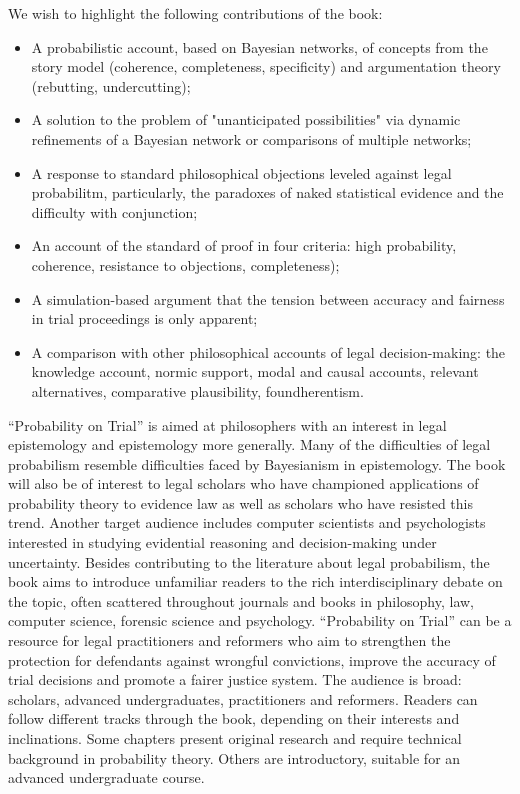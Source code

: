 \documentclass[
  10pt,
  dvipsnames,enabledeprecatedfontcommands]{scrartcl}
\begin{document}
We wish to highlight the following contributions of the book:

\begin{itemize}
\item A probabilistic account, based on Bayesian networks, of concepts from the story model (coherence, completeness, specificity) and argumentation theory (rebutting, undercutting);
\item A solution to the problem of "unanticipated possibilities" via dynamic refinements of a Bayesian network or comparisons of multiple networks;
\item A response to standard philosophical objections leveled against legal probabilitm, particularly, the paradoxes of naked statistical evidence and the difficulty with conjunction; 
\item An account of the standard of proof in four criteria: high probability, coherence, resistance to objections, completeness);
\item A simulation-based argument that the tension between accuracy and fairness in trial proceedings is only apparent;
\item A comparison with other philosophical accounts of legal decision-making: the knowledge account, normic support, modal and causal accounts, relevant alternatives, comparative plausibility, foundherentism.
\end{itemize}

``Probability on Trial'' is aimed at philosophers with an interest in
legal epistemology and epistemology more generally. Many of the
difficulties of legal probabilism resemble difficulties faced by
Bayesianism in epistemology. The book will also be of interest to legal
scholars who have championed applications of probability theory to
evidence law as well as scholars who have resisted this trend. Another
target audience includes computer scientists and psychologists
interested in studying evidential reasoning and decision-making under
uncertainty. Besides contributing to the literature about legal
probabilism, the book aims to introduce unfamiliar readers to the rich
interdisciplinary debate on the topic, often scattered throughout
journals and books in philosophy, law, computer science, forensic
science and psychology. ``Probability on Trial'' can be a resource for
legal practitioners and reformers who aim to strengthen the protection
for defendants against wrongful convictions, improve the accuracy of
trial decisions and promote a fairer justice system. The audience is
broad: scholars, advanced undergraduates, practitioners and reformers.
Readers can follow different tracks through the book, depending on their
interests and inclinations. Some chapters present original research and
require technical background in probability theory. Others are
introductory, suitable for an advanced undergraduate course.
\end{document}
